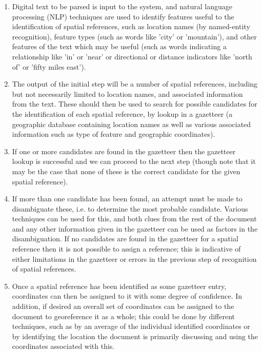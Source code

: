 \documentclass[12pt, a4paper]{report}
\begin{document}
\begin{enumerate}
	\item {Digital text to be parsed is input to the system, and natural language processing (NLP) techniques are used to identify features useful to the identification of spatial references, such as location names (by named-entity recognition), feature types (such as words like 'city' or 'mountain'), and other features of the text which may be useful (such as words indicating a relationship like 'in' or 'near' or directional or distance indicators like 'north of' or 'fifty miles east').}
	\item {The output of the initial step will be a number of spatial references, including but not necessarily limited to location names, and associated information from the text. These should then be used to search for possible candidates for the identification of each spatial reference, by lookup in a gazetteer (a geographic database containing location names as well as various associated information such as type of feature and geographic coordinates).}
	\item {If one or more candidates are found in the gazetteer then the gazetteer lookup is successful and we can proceed to the next step (though note that it may be the case that none of these is the correct candidate for the given spatial reference).}
	\item {If more than one candidate has been found, an attempt must be made to disambiguate these, i.e. to determine the most probable candidate. Various techniques can be used for this, and both clues from the rest of the document and any other information given in the gazetteer can be used as factors in the disambiguation. If no candidates are found in the gazetteer for a spatial reference then it is not possible to assign a reference; this is indicative of either limitations in the gazetteer or errors in the previous step of recognition of spatial references.}
	\item {Once a spatial reference has been identified as some gazetteer entry, coordinates can then be assigned to it with some degree of confidence. In addition, if desired an overall set of coordinates can be assigned to the document to georeference it as a whole; this could be done by different techniques, such as by an average of the individual identified coordinates or by identifying the location the document is primarily discussing and using the coordinates associated with this.}
\end{enumerate}
\end{document}
